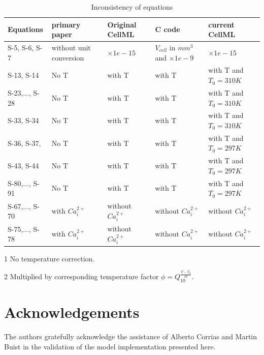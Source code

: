 \documentclass[fleqn,10pt]{physiome}
\begin{document}
\begin{table}[hbt!]\centering
\begin{threeparttable}
\caption{Inconsistency of equations}\label{tab:equations}

\begin{tabularx}{\textwidth} {m{2cm}m{2cm}m{2.3cm}m{2.3cm}X}
\toprule
Equations & primary paper & Original CellML & C code & current CellML\\
\midrule
S-5, S-6, S-7 & without unit conversion & $\times 1e-15$ & $V_{cell}$ in $mm^3$ and $\times 1e-9$ & $\times 1e-15$\\
S-13, S-14 & No T\tnote{1} & with T\tnote{2} &  with T\tnote{2} & with T\tnote{2} and $T_{0}=310K$\\
S-23,..., S-28 & No T\tnote{1} & with T\tnote{2} &  with T\tnote{2} & with T\tnote{2} and $T_{0}=310K$\\
S-33, S-34& No T\tnote{1} & with T\tnote{2} &  with T\tnote{2} & with T\tnote{2} and $T_{0}=310K$\\
S-36, S-37,& No T\tnote{1} & with T\tnote{2} &  with T\tnote{2} & with T\tnote{2} and $T_{0}=297K$\\
S-43, S-44 & No T\tnote{1} & with T\tnote{2} &  with T\tnote{2} & with T\tnote{2} and $T_{0}=297K$\\
S-80,..., S-91& No T\tnote{1} & with T\tnote{2} &  with T\tnote{2} & with T\tnote{2} and $T_{0}=297K$\\
S-67,..., S-70& with $Ca_i^{2+}$ & without $Ca_i^{2+}$ & without $Ca_i^{2+}$ & without $Ca_i^{2+}$\\
S-75,..., S-78 & with $Ca_i^{2+}$ & without $Ca_i^{2+}$ & without $Ca_i^{2+}$ & without $Ca_i^{2+}$\\
\bottomrule
\end{tabularx}
\begin{tablenotes}
\item[1] No temperature correction.
\item[2] Multiplied by corresponding temperature factor $\phi=Q_{10}^{\frac{T-T_0}{10}}$.
\end{tablenotes}
\end{threeparttable}
\end{table}

\section*{Acknowledgements}
The authors gratefully acknowledge the assistance of Alberto Corrias and Martin Buist in the validation of the model implementation presented here.


\end{document}
